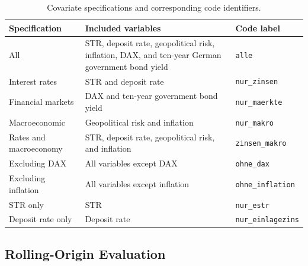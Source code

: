 \documentclass[11pt,a4paper]{article}
\newcommand{\estr}{\mbox{\texteuro STR}}
\begin{document}
\begin{table}[htbp]
    \centering
    \small
    \caption{Covariate specifications and corresponding code identifiers.}
    \label{tab:covariate_sets}
    \begin{tabularx}{\textwidth}{l X l}
        \toprule
        Specification & Included variables & Code label \\
        \midrule
        All & \estr, deposit rate, geopolitical risk, inflation, DAX,
        and ten-year German government bond yield & \texttt{alle} \\
        Interest rates & \estr{} and deposit rate & \texttt{nur\_zinsen} \\
        Financial markets & DAX and ten-year government bond yield &
        \texttt{nur\_maerkte} \\
        Macroeconomic & Geopolitical risk and inflation & \texttt{nur\_makro} \\
        Rates and macroeconomy & \estr, deposit rate, geopolitical risk,
        and inflation & \texttt{zinsen\_makro} \\
        Excluding DAX & All variables except DAX & \texttt{ohne\_dax} \\
        Excluding inflation & All variables except inflation &
        \texttt{ohne\_inflation} \\
        \estr{} only & \estr & \texttt{nur\_estr} \\
        Deposit rate only & Deposit rate & \texttt{nur\_einlagezins} \\
        \bottomrule
    \end{tabularx}
\end{table}

\subsection{Rolling-Origin Evaluation}
\label{subsec:rolling_evaluation}
\end{document}
